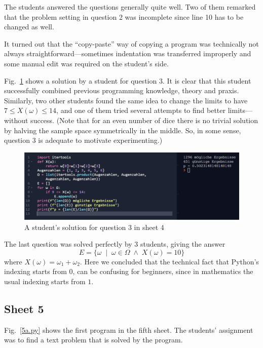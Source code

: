 \documentclass[]{interact}
\theoremstyle{plain}%
\theoremstyle{definition}
\theoremstyle{remark}
\begin{document}
The students answered the questions generally quite well. Two of them remarked that
the problem setting in question 2 was incomplete since line 10 has to be changed as well.

It turned out that the ``copy-paste'' way of copying a program was technically not always
straightforward---sometimes indentation was transferred improperly and some manual edit
was required on the student's side.

Fig.~\ref{42} shows a solution by a student for question 3. It is clear that this
student successfully combined previous programming knowledge, theory and praxis. Similarly,
two other students found the same idea to change the limits to have $7\leq X(\omega)\leq14$,
and one of them tried several attempts to find better limits---without success.
(Note that for an even number of dice there is no trivial solution by halving the
sample space symmetrically in the middle. So, in some sense, question 3 is adequate to motivate
experimenting.)

\begin{figure}
\begin{center}\includegraphics[width=1.0\textwidth]{42}
\caption{A student's solution for question 3 in sheet 4}
\label{42}
\end{center}
\end{figure}

The last question was solved perfectly by 3 students, giving the answer
$$E=\{\omega\;\mid\;\omega\in\Omega\;\land\;X(\omega)=10\}$$
where $X(\omega)=\omega_1+\omega_2$. Here we concluded that the technical
fact that Python's indexing starts from $0$, can be confusing for beginners,
since in mathematics the usual indexing starts from $1$.

\subsection*{Sheet 5}

Fig.~\ref{5a.py} shows the first program in the fifth sheet. The students' assignment was
to find a text problem that is solved by the program.
\end{document}
